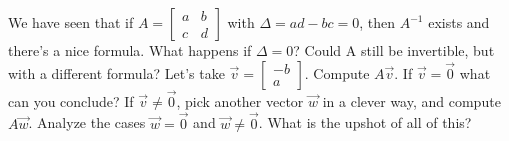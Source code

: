 \documentclass[11 pt]{article}
\newenvironment{problem}[2][Problem]{\begin{trivlist}
\item[\hskip \labelsep {\bfseries #1}\hskip \labelsep {\bfseries #2.}]}{\end{trivlist}}
\renewcommand{\a}{\alpha}
\begin{document}
\begin{problem}{K}
We have seen that if $A =
\begin{bmatrix}
a & b\\c & d
\end{bmatrix}$
with $\Delta = ad - bc = 0$, then $A^{-1}$
exists and
there’s a nice formula. What happens if $\Delta = 0$? Could A still be invertible, but
with a different formula? Let’s take $\vec{v} =
\begin{bmatrix}
-b\\a
\end{bmatrix}$. Compute $A\vec{v}$. If $\vec{v}= \vec{0}$ what can
you conclude? If $\vec{v} \ne \vec{0}$, pick another vector $\vec{w}$ in a clever way, and compute $A\vec{w}$.
Analyze the cases $\vec{w} = \vec{0}$ and $\vec{w} \ne \vec{0}$. What is the upshot of all of this?
\end{problem}
\end{document}
